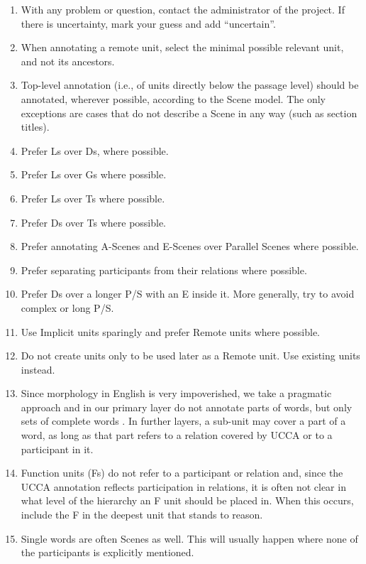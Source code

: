 \documentclass[11pt]{article}
\newcommand{\orig}[1]{{\color{red} {#1}}}
\newcommand{\dd}[1]{{\color{blue}{#1}}}
\begin{document}
\begin{enumerate}
\item
With any problem or question, contact the administrator of the project. 
If there is uncertainty, mark your guess and add ``uncertain''.
\item
When annotating a remote unit, select the minimal possible relevant unit, and not its ancestors.
\item
Top-level annotation (i.e., of units directly below the passage level) should be annotated, wherever possible, according to the Scene model. The only exceptions are cases that do not describe a Scene in any way (such as section titles).
\item
Prefer Ls over Ds, where possible.
\item
Prefer Ls over Gs where possible.
\item
Prefer Ls over Ts where possible.
\item
Prefer Ds over Ts where possible.
\item
Prefer annotating A-Scenes and E-Scenes over Parallel Scenes where possible.
\item
Prefer separating participants from their relations where possible.
\item
Prefer Ds over a longer P/S with an E inside it. More generally, try to avoid complex or long P/S.

\item
Use Implicit units sparingly and prefer Remote units where possible.
\item
Do not create units only to be used later as a Remote unit. Use existing units instead.
\item
Since morphology in English is very impoverished, we take a pragmatic approach and in our primary layer do not annotate parts of words, but only sets of complete words . In further layers, a sub-unit may cover a part of a word, as long as that part refers to a relation covered by UCCA or to a participant in it.
\item
Function units (Fs) do not refer to a participant or relation and, since the UCCA annotation reflects participation in relations, it is often not clear in what level of the hierarchy an F unit should be placed in. When this occurs, include the F in the deepest unit that stands to reason.
\item
Single words are often Scenes as well. This will usually happen where none of the participants is explicitly mentioned.


\end{enumerate}
\end{document}
